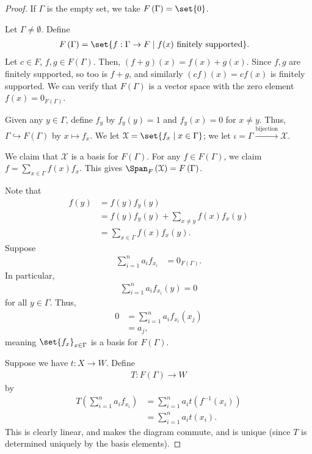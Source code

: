 \documentclass[10pt]{mypackage}
\begin{document}
\begin{proof}
  If $\Gamma$ is the empty set, we take $F\left(\Gamma\right) = \set{0}$.\newline

  Let $\Gamma \neq \emptyset$. Define
  \begin{align*}
    F\left(\Gamma\right) &= \set{f: \Gamma\rightarrow F\mid f(x)\text{ finitely supported}}.
  \end{align*}
  Let $c\in F$, $f,g\in F(\Gamma)$. Then, $\left(f+g\right)(x) = f(x) + g(x)$. Since $f,g$ are finitely supported, so too is $f+g$, and similarly $\left(cf\right)(x) = cf(x)$ is finitely supported. We can verify that $F\left(\Gamma\right)$ is a vector space with the zero element $f(x) = 0_{F\left(\Gamma\right)}$.\newline

  Given any $y\in \Gamma$, define $f_y$ by $f_y(y) = 1$ and $f_y(x) = 0$ for $x\neq y$. Thus, $\Gamma\hookrightarrow F\left(\Gamma\right)$ by $x\mapsto f_{x}$. We let $\mathcal{X} = \set{f_x\mid x\in \Gamma}$; we let $\iota = \Gamma \xrightarrow{\text{bijection}}\mathcal{X}$.\newline

  We claim that $\mathcal{X}$ is a basis for $F\left(\Gamma\right)$. For any $f\in F\left(\Gamma\right)$, we claim $f = \sum_{x\in \Gamma}f(x)f_x$. This gives $\Span_{F}\left(\mathcal{X}\right) = F\left(\Gamma\right)$.\newline

  Note that
  \begin{align*}
    f(y) &= f(y)f_y(y)\\
         &= f(y)f_y(y) + \sum_{x\neq y}f(x)f_x(y)\\
         &= \sum_{x\in\Gamma}f(x)f_x(y).
  \end{align*}
  Suppose
  \begin{align*}
    \sum_{i=1}^{n}a_if_{x_i} &= 0_{F\left(\Gamma\right)}.
  \end{align*}
  In particular,
  \begin{align*}
    \sum_{i=1}^{n}a_if_{x_i}(y) = 0
  \end{align*}
  for all $y\in \Gamma$. Thus,
  \begin{align*}
    0 &= \sum_{i=1}^{n}a_if_{x_i}\left(x_j\right)\\
      &= a_j,
  \end{align*}
  meaning $\set{f_{x}}_{x\in \Gamma}$ is a basis for $F\left(\Gamma\right)$.\newline

  Suppose we have $t: X\rightarrow W$. Define
  \begin{align*}
    T: F\left(\Gamma\right) \rightarrow W
  \end{align*}
  by
  \begin{align*}
    T\left(\sum_{i=1}^{n}a_if_{x_i}\right) &= \sum_{i=1}^{n}a_it\left(f^{-1}\left(x_i\right)\right)\\
                                           &= \sum_{i=1}^{n}a_it\left(x_i\right).
  \end{align*}
  This is clearly linear, and makes the diagram commute, and is unique (since $T$ is determined uniquely by the basis elements).
\end{proof}
\end{document}
